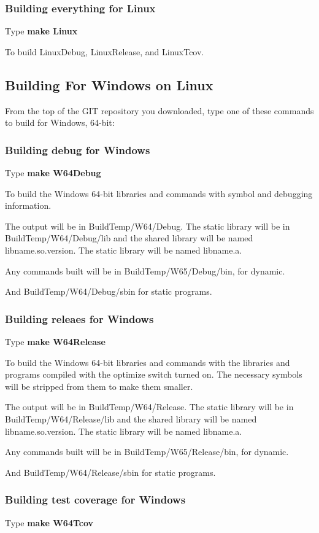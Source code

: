 \subsubsection{Building everything for Linux}
Type \textbf{make Linux}

To build LinuxDebug, LinuxRelease, and LinuxTcov.

\subsection{Building For Windows on Linux}
  
From the top of the GIT repository you downloaded,
type one of these commands to build for Windows, 64-bit:


\subsubsection{Building debug for Windows}
Type \textbf{make W64Debug}

 To build the Windows 64-bit libraries and commands with symbol
 and debugging information.

 The output will be in BuildTemp/W64/Debug.
 The static library will be in BuildTemp/W64/Debug/lib
 and the shared library will be named lib{name}.so.{version}.
 The static library will be named lib{name}.a.
  
 Any commands built will be in BuildTemp/W65/Debug/bin,
 for dynamic.
  
 And BuildTemp/W64/Debug/sbin for static programs.

\subsubsection{Building releaes for Windows}
Type \textbf{make W64Release}

To build the Windows 64-bit libraries and commands with the libraries
and programs compiled with the optimize switch turned on.
The necessary symbols will be stripped from them to make
them smaller.

The output will be in BuildTemp/W64/Release.
The static library will be in BuildTemp/W64/Release/lib
and the shared library will be named lib{name}.so.{version}.
The static library will be named lib{name}.a.
  
Any commands built will be in BuildTemp/W65/Release/bin,
for dynamic.
  
And BuildTemp/W64/Release/sbin for static programs.
  
\subsubsection{Building test coverage for Windows}
Type \textbf{make W64Tcov}

